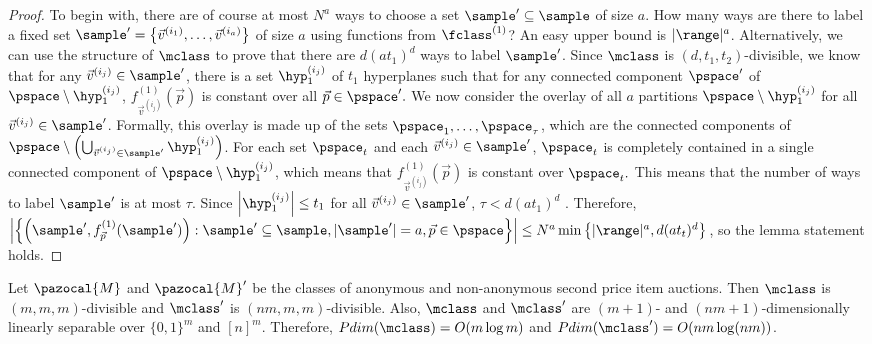 \begin{proof}
To begin with, there are of course at most $N^a$ ways to choose a set $\sample' \subseteq \sample$ of size $a$. How many ways are there to label a fixed set $\sample' = \left\{\vec{v}^{(i_1)}, \dots, \vec{v}^{(i_a)}\right\}$ of size $a$ using functions from $\fclass^{(1)}$? An easy upper bound is $|\range|^a$. Alternatively, we can use the structure of $\mclass$ to prove that there are $d(at_1)^d$ ways to label $\sample'$. Since $\mclass$ is $(d,t_1, t_2)$-divisible, we know that for any $\vec{v}^{(i_j)} \in \sample'$, there is a set $\hyp_1^{(i_j)}$ of $t_1$ hyperplanes such that for any connected component $\pspace'$ of $\pspace \setminus \hyp_1^{(i_j)}$, $f^{(1)}_{\vec{v}^{(i_j)}}(\vec{p})$ is constant over all $\vec{p} \in \pspace'.$
We now consider the overlay of all $a$ partitions $\pspace\setminus \hyp_1^{(i_j)}$ for all $\vec{v}^{(i_j)} \in \sample'$. Formally, this overlay is made up of the sets $\pspace_1, \dots, \pspace_{\tau}$, which are the connected components 
of $\pspace \setminus \left(\bigcup_{\vec{v}^{(i_j)} \in \sample'} \hyp_1^{(i_j)}\right)$. For each set $\pspace_t$ and each $\vec{v}^{(i_j)} \in \sample'$, $\pspace_t$ is completely contained in a single connected component of $\pspace \setminus \hyp_1^{(i_j)}$, which means that $f^{(1)}_{\vec{v}^{(i_j)}}\left(\vec{p}\right)$ is constant over $\pspace_t.$ 
%
This means that the number of ways to label $\sample'$ is at most $\tau$. Since $\left|\hyp_1^{(i_j)}\right|\leq t_1$ for all $\vec{v}^{(i_j)} \in \sample'$, $\tau < d(at_1)^d$ \citep{Buck43:Partition}.
Therefore, $\left|\left\{ \left(\sample', f^{(1)}_{\vec{p}}(\sample')\right) : \sample' \subseteq \sample, |\sample'| = a, \vec{p} \in \pspace\right\}\right| \leq N^a\min\left\{|\range|^a, d(at_t)^d\right\}$, so the lemma statement holds.
\end{proof}

\begin{theorem}\label{thm:second_price_sep}
Let $\pazocal{M}$ and $\pazocal{M}'$ be the classes of anonymous and non-anonymous second price item auctions. Then $\mclass$ is $\left(m, m, m\right)$-divisible and $\mclass'$ is $(nm, m, m)$-divisible. Also, $\mclass$ and $\mclass'$ are $(m+1)$- and $(nm+1)$-dimensionally linearly separable over $\{0,1\}^m$ and $[n]^m$. Therefore, $Pdim(\mclass) = O(m \log m)$ and $Pdim(\mclass') = O(nm \log (nm))$.
\end{theorem}

